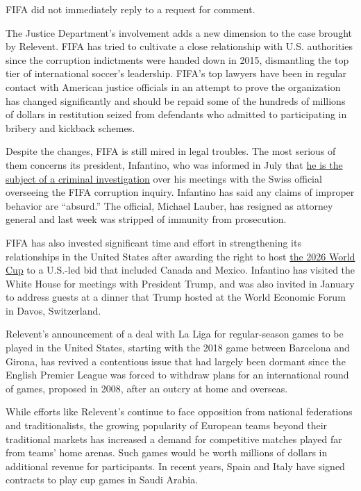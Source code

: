 FIFA did not immediately reply to a request for comment.

The Justice Department's involvement adds a new dimension to the case
brought by Relevent. FIFA has tried to cultivate a close relationship
with U.S. authorities since the corruption indictments were handed down
in 2015, dismantling the top tier of international soccer's leadership.
FIFA's top lawyers have been in regular contact with American justice
officials in an attempt to prove the organization has changed
significantly and should be repaid some of the hundreds of millions of
dollars in restitution seized from defendants who admitted to
participating in bribery and kickback schemes.

Despite the changes, FIFA is still mired in legal troubles. The most
serious of them concerns its president, Infantino, who was informed in
July that
\href{https://www.nytimes3xbfgragh.onion/2020/07/30/sports/soccer/fifa-gianni-infantino-investigation.html}{he
is the subject of a criminal investigation} over his meetings with the
Swiss official overseeing the FIFA corruption inquiry. Infantino has
said any claims of improper behavior are ``absurd.'' The official,
Michael Lauber, has resigned as attorney general and last week was
stripped of immunity from prosecution.

FIFA has also invested significant time and effort in strengthening its
relationships in the United States after awarding the right to host
\href{https://www.nytimes3xbfgragh.onion/2018/06/04/sports/2026-world-cup-bid.html}{the
2026 World Cup} to a U.S.-led bid that included Canada and Mexico.
Infantino has visited the White House for meetings with President Trump,
and was also invited in January to address guests at a dinner that Trump
hosted at the World Economic Forum in Davos, Switzerland.

Relevent's announcement of a deal with La Liga for regular-season games
to be played in the United States, starting with the 2018 game between
Barcelona and Girona, has revived a contentious issue that had largely
been dormant since the English Premier League was forced to withdraw
plans for an international round of games, proposed in 2008, after an
outcry at home and overseas.

While efforts like Relevent's continue to face opposition from national
federations and traditionalists, the growing popularity of European
teams beyond their traditional markets has increased a demand for
competitive matches played far from teams' home arenas. Such games would
be worth millions of dollars in additional revenue for participants. In
recent years, Spain and Italy have signed contracts to play cup games in
Saudi Arabia.

